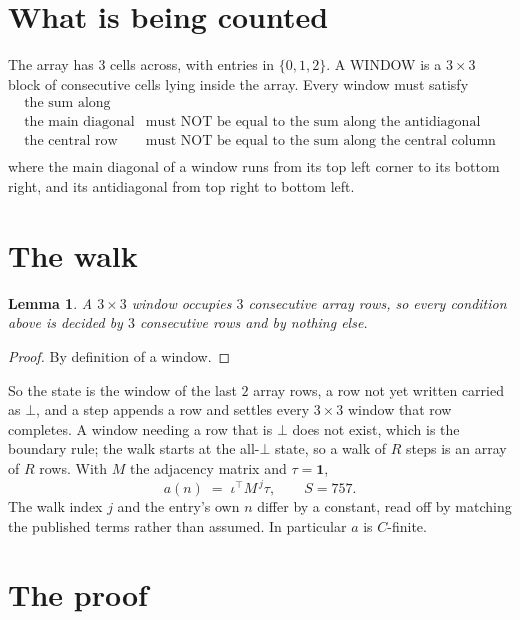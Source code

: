 \documentclass[11pt,a4paper]{article}
\theoremstyle{plain}
\newtheorem{lemma}[theorem]{Lemma}
\theoremstyle{definition}
\begin{document}
\section{What is being counted}

The array has $3$ cells across, with entries in $\{0,1,2\}$. A WINDOW is a $3\times3$ block
of consecutive cells lying inside the array. Every window must satisfy
\[
\begin{array}{ll}
\text{the sum along} & \text{} \\[2pt]
\text{the main diagonal} & \text{must NOT be equal to the sum along the antidiagonal} \\
\text{the central row} & \text{must NOT be equal to the sum along the central column} \\
\end{array}
\]
where the main diagonal of a window runs from its top left corner to its bottom right, and its
antidiagonal from top right to bottom left.

\section{The walk}

\begin{lemma}\label{lem:win}
A $3\times3$ window occupies $3$ consecutive array rows, so every condition above is
decided by $3$ consecutive rows and by nothing else.
\end{lemma}

\begin{proof}
By definition of a window.
\end{proof}

So the state is the window of the last $2$ array rows, a row not yet written carried as
$\bot$, and a step appends a row and settles every $3\times3$ window that row completes. A
window needing a row that is $\bot$ does not exist, which is the boundary rule; the walk starts
at the all-$\bot$ state, so a walk of $R$ steps is an array of $R$ rows. With $M$ the adjacency
matrix and $\tau=\mathbf{1}$,
\[
a(n)\;=\;\iota^{\!\top}M^{\,j}\tau ,\qquad S=757.
\]
The walk index $j$ and the entry's own $n$ differ by a constant, read off by matching the
published terms rather than assumed. In particular $a$ is $C$-finite.

\section{The proof}
\end{document}
